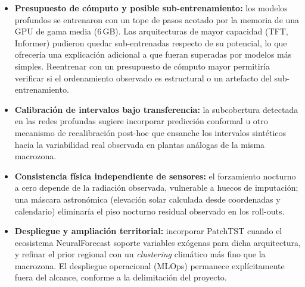 \begin{itemize}
    \item \textbf{Presupuesto de cómputo y posible sub-entrenamiento:} los modelos profundos se entrenaron con un tope de pasos acotado por la memoria de una GPU de gama media (6\,GB). Las arquitecturas de mayor capacidad (TFT, Informer) pudieron quedar sub-entrenadas respecto de su potencial, lo que ofrecería una explicación adicional a que fueran superadas por modelos más simples. Reentrenar con un presupuesto de cómputo mayor permitiría verificar si el ordenamiento observado es estructural o un artefacto del sub-entrenamiento.
    \item \textbf{Calibración de intervalos bajo transferencia:} la subcobertura detectada en las redes profundas sugiere incorporar predicción conformal u otro mecanismo de recalibración post-hoc que ensanche los intervalos sintéticos hacia la variabilidad real observada en plantas análogas de la misma macrozona.
    \item \textbf{Consistencia física independiente de sensores:} el forzamiento nocturno a cero depende de la radiación observada, vulnerable a huecos de imputación; una máscara astronómica (elevación solar calculada desde coordenadas y calendario) eliminaría el piso nocturno residual observado en los roll-outs.
    \item \textbf{Despliegue y ampliación territorial:} incorporar PatchTST cuando el ecosistema NeuralForecast soporte variables exógenas para dicha arquitectura, y refinar el prior regional con un \textit{clustering} climático más fino que la macrozona. El despliegue operacional (MLOps) permanece explícitamente fuera del alcance, conforme a la delimitación del proyecto.
\end{itemize}
